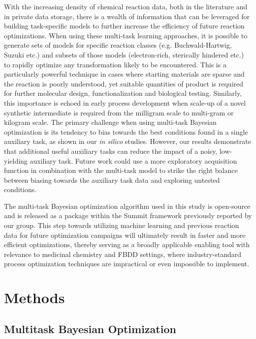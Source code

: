 With the increasing density of chemical reaction data, both in the literature and in private data storage, there is a wealth of information that can be leveraged for building task-specific models to further increase the efficiency of future reaction optimizations. When using these multi-task learning approaches, it is possible to generate sets of models for specific reaction classes (e.g. Buchwald-Hartwig, Suzuki etc.) and subsets of those models (electron-rich, sterically hindered etc.) to rapidly optimize any transformation likely to be encountered. This is a particularly powerful technique in cases where starting materials are sparse and the reaction is poorly understood, yet suitable quantities of product is required for further molecular design, functionalization and biological testing. Similarly, this importance is echoed in early process development when scale-up of a novel synthetic intermediate is required from the milligram scale to multi-gram or kilogram scale. The primary challenge when using multi-task Bayesian optimization is its tendency to bias towards the best conditions found in a single auxiliary task, as shown in our \textit{in silico} studies. However, our results demonstrate that additional useful auxiliary tasks can reduce the impact of a noisy, low-yielding auxiliary task. Future work could use a more exploratory acquisition function in combination with the multi-task model to strike the right balance between biasing towards the auxiliary task data and exploring untested conditions.

The multi-task Bayesian optimization algorithm used in this study is open-source and is released as a package within the Summit framework previously reported by our group. This step towards utilizing machine learning and previous reaction data for future optimization campaigns will ultimately result in faster and more efficient optimizations, thereby serving as a broadly applicable enabling tool with relevance to medicinal chemistry and FBDD settings, where industry-standard process optimization techniques are impractical or even impossible to implement.

\section{Methods}


\subsection{Multitask Bayesian Optimization}

